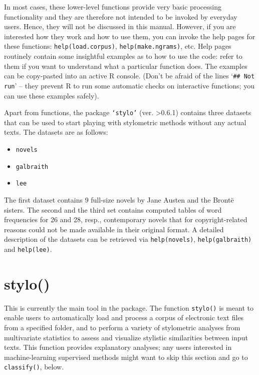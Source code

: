\documentclass[11pt,a4paper]{article}
\def\code#1{{\tt #1}}
\begin{document}
In most cases, these lower-level functions provide very basic processing
functionality and they are therefore not intended to be invoked by
everyday users. Hence, they will not be discussed in this manual.
However, if you are interested how they work and how to use them,
you can invoke the help pages for these functions: \code{help(load.corpus)},
\code{help(make.ngrams)}, etc. Help pages routinely contain some
insightful examples as to how to use the code: refer to them if you
want to understand what a particular function does. The examples can
be copy-pasted into an active R console. (Don't be afraid of the lines
`\code{\#\#~Not run}' -- they prevent R to run some automatic
checks on interactive functions; you can use these examples safely).

Apart from functions, the package \code{`stylo'} (ver. >0.6.1) contains 
three datasets that can be used to start playing with stylometric methods 
without any actual texts. The datasets are as follows:

\begin{itemize}
  \item \code{novels}
  \item \code{galbraith}
  \item \code{lee}
\end{itemize}

The first dataset contains 9 full-size novels by Jane Austen and 
the Bront\"e sisters. The second and the third set contains computed
tables of word frequencies for 26 and 28, resp., contemporary novels 
that for copyright-related reasons could not be made available in 
their original format. A detailed description of the datasets 
can be retrieved via \code{help(novels)}, \code{help(galbraith)}
and \code{help(lee)}. 

\section{stylo()}

This is currently the main tool in the package. The function \code{stylo()}
is meant to enable users to automatically load and process a corpus
of electronic text files from a specified folder, and to perform a
variety of stylometric analyses from multivariate statistics to assess
and visualize stylistic similarities between input texts. This function
provides explanatory analyses; any users interested in machine-learning
supervised methods might want to skip this section and go to 
\code{classify()}, below.
\end{document}
